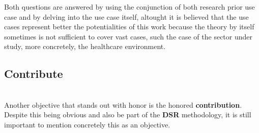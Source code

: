 Both questions are answered by using the conjunction of both research prior use case and by delving into the 
use case itself, altought it is believed that the use cases represent better the potentialities of this work 
because the theory by itself sometimes is not sufficient to cover vast cases, such the case of the sector under 
study, more concretely, the healthcare environment.

\subsection{Contribute}\mbox{}\\
Another objective that stands out with honor is the honored \textbf{contribution}. Despite this being obvious 
and also be part of the \textbf{DSR} methodology, it is still important to mention concretely this as an 
objective.
